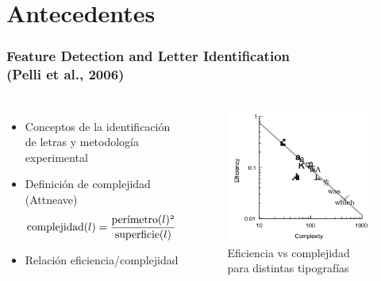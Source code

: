 \documentclass[10pt]{beamer}
\begin{document}
  \section{Antecedentes}
	\begin{frame}
	\frametitle{Feature Detection and Letter Identification\\(Pelli et al., 2006)}
	\begin{columns}[t]
	\begin{itemize}
		\item Conceptos de la identificación de letras y metodología experimental\pause
		\item Definición de complejidad (Attneave)
		  \begin{equation*}
		   \mathnormal{\text{complejidad}(l) = \frac{\text{per\'imetro}(l)^2}{\text{superficie}(l)}}
		  \end{equation*}\pause
		\item Relación eficiencia/complejidad
	\end{itemize}


	\begin{figure}
	\includegraphics[width=\textwidth]{graficos/pelli4.png}
	\caption{Eficiencia vs complejidad para distintas tipografías}
	\end{figure}
	\end{columns}
  \end{frame}
\end{document}
